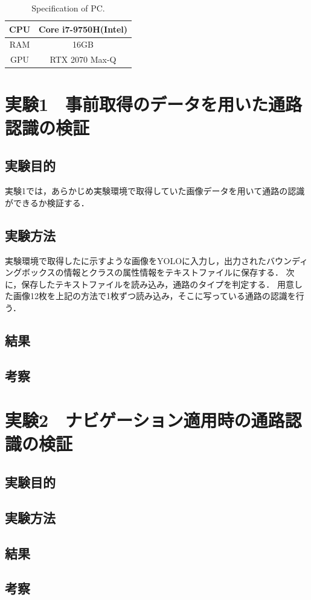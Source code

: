 \documentclass[../main]{subfiles}
\begin{document}
        \begin{table}[H]
         \centering
         \begin{tabular}{l|l} \hline
         \multicolumn{1}{c|}{CPU} & \multicolumn{1}{c}{Core i7-9750H(Intel)} \\ \hline
         \multicolumn{1}{c|}{RAM} & \multicolumn{1}{c}{16GB} \\ \hline
         \multicolumn{1}{c|}{GPU} & \multicolumn{1}{c}{RTX 2070 Max-Q} \\ \hline
         \end{tabular}
         \caption{Specification of PC.}
         \label{table::pc_spec}
        \end{table}

    \section{実験1　事前取得のデータを用いた通路認識の検証}
        \subsection{実験目的}
        実験1では，あらかじめ実験環境で取得していた画像データを用いて通路の認識ができるか検証する．
        \subsection{実験方法}
        実験環境で取得したに示すような画像をYOLOに入力し，出力されたバウンディングボックスの情報とクラスの属性情報をテキストファイルに保存する．
        次に，保存したテキストファイルを読み込み，通路のタイプを判定する．
        用意した画像12枚を上記の方法で1枚ずつ読み込み，そこに写っている通路の認識を行う．

        \subsection{結果}

        \subsection{考察}
    \section{実験2　ナビゲーション適用時の通路認識の検証}
        \subsection{実験目的}

        \subsection{実験方法}

        \subsection{結果}

        \subsection{考察}
\end{document}
